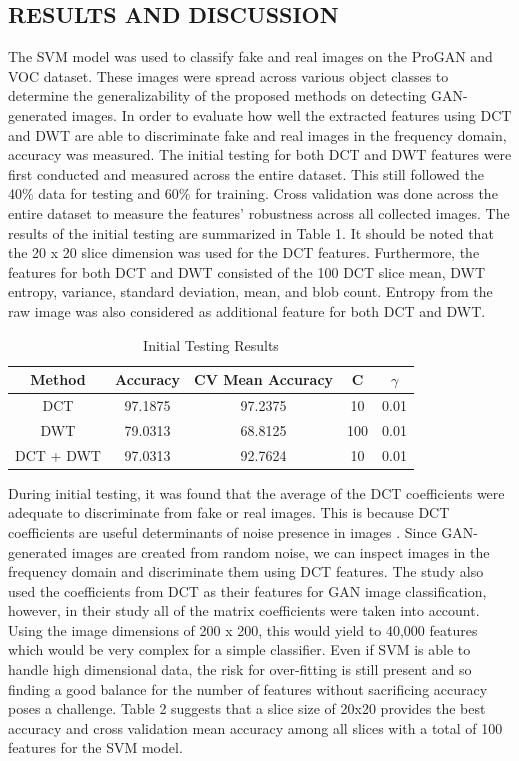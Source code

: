 \documentclass{icsthesis}
\begin{document}
\begin{mainmatter}
\section{RESULTS AND DISCUSSION}
The SVM model was used to classify fake and real images on the ProGAN and VOC dataset. These images were spread across various object classes to determine the generalizability of the proposed methods on detecting GAN-generated images. In order to evaluate how well the extracted features using DCT and DWT are able to discriminate fake and real images in the frequency domain, accuracy was measured. The initial testing for both DCT and DWT features were first conducted and measured across the entire dataset. This still followed the 40\% data for testing and 60\% for training. Cross validation was done across the entire dataset to measure the features' robustness across all collected images. The results of the initial testing are summarized in Table 1. It should be noted that the 20 x 20 slice dimension was used for the DCT features. Furthermore, the features for both DCT and DWT consisted of the 100 DCT slice mean, DWT entropy, variance, standard deviation, mean, and blob count. Entropy from the raw image was also considered as additional feature for both DCT and DWT. 
\\
\begin{table}[H]
\centering
\begin{tabular}{|c|c|c|c|c|}
\hline
Method    & Accuracy & CV Mean Accuracy & C   & $\gamma$    \\ \hline
DCT       & 97.1875  & 97.2375          & 10  & 0.01 \\ \hline
DWT       & 79.0313  & 68.8125          & 100 & 0.01 \\ \hline
DCT + DWT & 97.0313  & 92.7624          & 10  & 0.01 \\ \hline
\end{tabular}
\caption{Initial Testing Results}
\end{table}

During initial testing, it was found that the average of the DCT coefficients were adequate to discriminate from fake or real images. This is because DCT coefficients are useful determinants of noise presence in images \citep{noise-estimation}. Since GAN-generated images are created from random noise, we can inspect images in the frequency domain and discriminate them using DCT features. The study \cite{lev-freq-dct} also used the coefficients from DCT as their features for GAN image classification, however, in their study all of the matrix coefficients were taken into account. Using the image dimensions of 200 x 200, this would yield to 40,000 features which would be very complex for a simple classifier. Even if SVM is able to handle high dimensional data, the risk for over-fitting is still present and so finding a good balance for the number of features without sacrificing accuracy poses a challenge. Table 2 suggests that a slice size of 20x20 provides the best accuracy and cross validation mean accuracy among all slices with a total of 100 features for the SVM model. 


\end{mainmatter}
\end{document}
